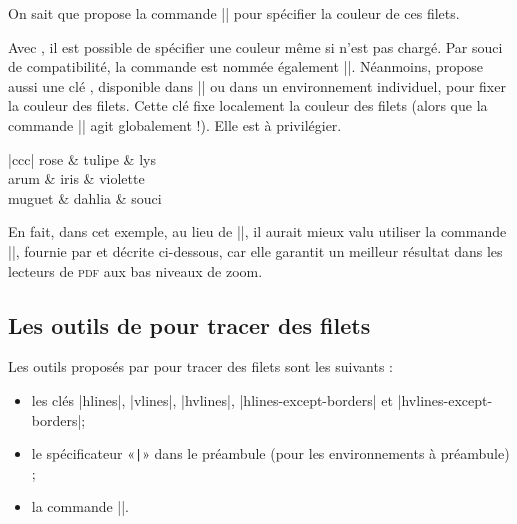 \documentclass[dvipsnames]{article}
\let\myrlap\rlap
\begin{document}
\smallskip
On sait que  propose la commande |\arrayrulecolor| pour spécifier
la couleur de ces filets.

\smallskip
{} 
Avec , il est possible de spécifier une couleur même si
 n'est pas chargé. Par souci de compatibilité, la commande est
nommée également |\arrayrulecolor|. Néanmoins,  propose aussi
une clé , disponible dans |\NiceMatrixOptions| ou dans un
environnement individuel, pour fixer la couleur des filets. Cette clé fixe
localement la couleur des filets (alors que la commande |\arrayrulecolor| agit
globalement !). Elle est à privilégier.

\medskip
\begin{Code}[width=10cm,show-output,no-cell-nodes]
\begin{NiceTabular}{|ccc|}\myrlap{[\emph{rules/color=[gray]{0.9},rules/width=1pt}]}
\hline
rose & tulipe & lys \\
arum & iris & violette \\
muguet & dahlia & souci \\
\hline
\end{NiceTabular}
\end{Code}


\medskip
En fait, dans cet exemple, au lieu de |\hline|, il aurait mieux valu utiliser la
commande |\Hline|, fournie par  et décrite ci-dessous, car elle
garantit un meilleur résultat dans les lecteurs de \textsc{pdf} aux bas niveaux de zoom.



\medskip
\subsection{Les outils de \texorpdfstring{}{nicematrix} pour tracer des filets}



Les outils proposés par  pour tracer des filets sont les
suivants :
\begin{itemize}[beginpenalty=10000]
\item les clés |hlines|, |vlines|, |hvlines|, |hlines-except-borders| et
|hvlines-except-borders|;
\item le spécificateur «\verb+|+» dans le préambule (pour les environnements à
préambule) ;
\item {}
la commande |\Hline|.
\end{itemize}
\end{document}
